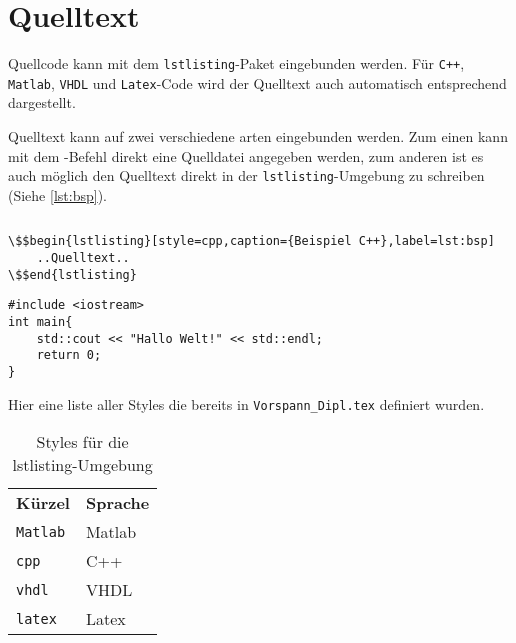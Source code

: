 \section{Quelltext}
Quellcode kann mit dem \verb|lstlisting|-Paket eingebunden werden. Für \verb|C++|, \verb|Matlab|, \verb|VHDL| und \verb|Latex|-Code wird der Quelltext auch automatisch entsprechend dargestellt. 

Quelltext kann auf zwei verschiedene arten eingebunden werden. Zum einen kann mit dem \verb||-Befehl direkt eine Quelldatei angegeben werden, zum anderen ist es auch möglich den Quelltext direkt in der \verb|lstlisting|-Umgebung zu schreiben (Siehe \autoref{lst:bsp}).
\vspace{5mm}
\begin{lstlisting}[style=latex]

\end{lstlisting}


\begin{lstlisting}[style=latex,mathescape=true]
\$$begin{lstlisting}[style=cpp,caption={Beispiel C++},label=lst:bsp]
	..Quelltext..
\$$end{lstlisting}
\end{lstlisting}
\begin{lstlisting}[style=cpp,caption={Beispiel C++},label=lst:bsp]
#include <iostream>
int main{
	std::cout << "Hallo Welt!" << std::endl;
	return 0;
}
\end{lstlisting}

Hier eine liste aller Styles die bereits in \verb|Vorspann_Dipl.tex| definiert wurden.
\begin{table}[h]
	\centering
	\caption{Styles für die lstlisting-Umgebung}
	\label{tab:lstlistingstyle}
	\begin{tabular}{@{}L{0.2\textwidth}L{0.2\textwidth}@{}}
		{\color[HTML]{FFFFFF} \textbf{Kürzel}} & {\color[HTML]{FFFFFF} \textbf{Sprache}}\\
		
		\verb|Matlab| & Matlab\\
		
		\verb|cpp| & C++\\
		
		\verb|vhdl| & VHDL\\
		
		\verb|latex| & Latex\\
	\end{tabular}
\end{table}

